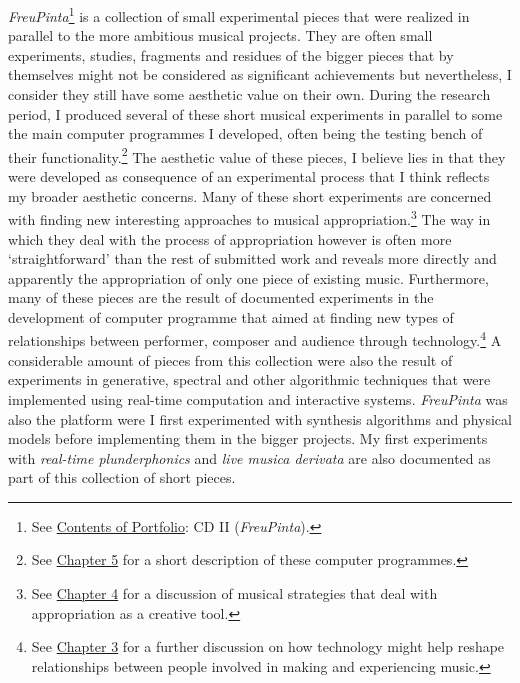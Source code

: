 \emph{FreuPinta}\footnote{See \hyperlink{portfolio}{Contents of Portfolio}: CD II (\emph{FreuPinta}).} is a collection of small experimental pieces that were realized in parallel to the more ambitious musical projects. They are often small experiments, studies, fragments and residues of the bigger pieces that by themselves might not be considered as significant achievements but nevertheless, I consider they still have some aesthetic value on their own. During the research period, I produced several of these short musical experiments in parallel to some the main computer programmes I developed, often being the testing bench of their functionality.\footnote{See \hyperlink{chapter5}{Chapter 5} for a short description of these computer programmes.} The aesthetic value of these pieces, I believe lies in that they were developed as consequence of an experimental process that I think reflects my broader aesthetic concerns. Many of these short experiments are concerned with finding new interesting approaches to musical appropriation.\footnote{See \hyperlink{chapter4}{Chapter 4} for a discussion of musical strategies that deal with appropriation as a creative tool.} The way in which they deal with the process of appropriation however is often more `straightforward' than the rest of submitted work and reveals more directly and apparently the appropriation of only one piece of existing music. Furthermore, many of these pieces are the result of documented experiments in the development of computer programme that aimed at finding new types of relationships between performer, composer and audience through technology.\footnote{See \hyperlink{chapter3}{Chapter 3} for a further discussion on how technology might help reshape relationships between people involved in making and experiencing music.} A considerable amount of pieces from this collection were also the result of experiments in generative, spectral and other algorithmic techniques that were implemented using real-time computation and interactive systems. \emph{FreuPinta} was also the platform were I first experimented with synthesis algorithms and physical models before implementing them in the bigger projects. My first experiments with \emph{real-time plunderphonics} and \emph{live musica derivata} are also documented as part of this collection of short pieces. 

